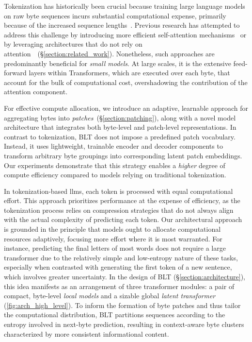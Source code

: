 Tokenization has historically been crucial because training large language models on raw byte sequences incurs substantial computational expense, primarily because of the increased sequence lengths~\citep{xue2022byt5}. Previous research has attempted to address this challenge by introducing more efficient self-attention mechanisms~\citep{el2020characterbert, clark2022canine} or by leveraging architectures that do not rely on attention~\citep{wang2024mambabyte}~(\S\ref{section:related_work}). Nonetheless, such approaches are predominantly beneficial for \textit{small models}. At large scales, it is the extensive feed-forward layers within Transformers, which are executed over each byte, that account for the bulk of computational cost, overshadowing the contribution of the attention component.

For effective compute allocation, we introduce an adaptive, learnable approach for aggregating bytes into \textit{patches}~(\S\ref{section:patching}), along with a novel model architecture that integrates both byte-level and patch-level representations. In contrast to tokenization, {\textsc BLT} does not impose a predefined patch vocabulary. Instead, it uses lightweight, trainable encoder and decoder components to transform arbitrary byte groupings into corresponding latent patch embeddings. Our experiments demonstrate that this strategy enables a \textit{higher} degree of compute efficiency compared to models relying on traditional tokenization.

In tokenization-based llms, each token is processed with equal computational effort. This approach prioritizes performance at the expense of efficiency, as the tokenization process relies on compression strategies that do not always align with the actual complexity of predicting each token. Our architectural approach is grounded in the principle that models ought to allocate computational resources adaptively, focusing more effort where it is most warranted. For instance, predicting the final letters of most words does not require a large transformer due to the relatively simple and low-entropy nature of these tasks, especially when contrasted with generating the first token of a new sentence, which involves greater uncertainty. In the design of {\textsc BLT} (\S\ref{section:architecture}), this idea manifests as an arrangement of three transformer modules: a pair of compact, byte-level \textit{local models} and a sizable global \textit{latent transformer} (\autoref{fig:arch_high_level}). To inform the formation of byte patches and thus tailor the computational distribution, {\textsc BLT} partitions sequences according to the entropy involved in next-byte prediction, resulting in context-aware byte clusters characterized by more consistent informational content.

